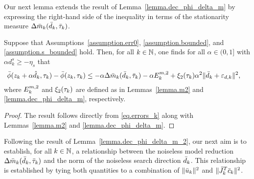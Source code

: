 Our next lemma extends the result of Lemma~\ref{lemma.dec_phi_delta_m} by expressing the right-hand side of the inequality in terms of the stationarity measure $\Delta {\bar m}_k({\bar d}_k, {\bar \tau}_k)$.

\begin{lemma}\label{lemma.dec_phi_delta_m_2}
  Suppose that Assumptions~\ref{assumption.err0}, \ref{assumption.bounded}, and \ref{assumption.s_bounded}  hold.  Then, for all $k \in \mathbb{N}$, one finds for all $\alpha \in (0, 1]$ with $\alpha d_k^s \geq -\eta_s$ that
  \begin{align*}
    {\bar \phi}(z_k+\alpha {\hat d}_k, \tau_k) - {\bar \phi}(z_k, \tau_k) & \leq - \alpha \Delta {\bar m}_k({\bar d}_k, {\bar \tau}_k)  - \alpha E_k^{m, 2} + \xi_2(\tau_k) \alpha^2 \|{\bar d}_k + \varepsilon_{d,k}\|^2,
  \end{align*}
  where $E_k^{m, 2}$ and $\xi_2(\tau_k)$ are defined as in Lemmas~\ref{lemma.m2} and \ref{lemma.dec_phi_delta_m}, respectively.
\end{lemma}
\begin{proof}
  The result follows directly from \eqref{eq.errors_k} along with Lemmas~\ref{lemma.m2} and \ref{lemma.dec_phi_delta_m}.
\end{proof}

Following the result of Lemma~\ref{lemma.dec_phi_delta_m_2}, our next aim is to establish, for all $k \in \mathbb{N}$, a relationship between the noiseless model reduction $\Delta {\bar m}_k({\bar d}_k, {\bar \tau}_k)$ and the norm of the noiseless search direction ${\bar d}_k$.  This relationship is established by tying both quantities to a combination of $\|{\bar u}_k\|^2$ and $\|{\bar J}_k^T {\bar c}_k\|^2$.

